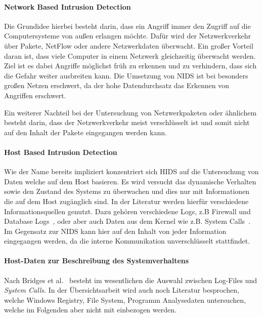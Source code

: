             \paragraph{Network Based Intrusion Detection}
                Die Grundidee hierbei besteht darin, dass ein Angriff immer den Zugriff auf die Computersysteme von außen erlangen möchte.
                Dafür wird der Netzwerkverkehr über Pakete, NetFlow oder andere Netzwerkdaten überwacht.
                Ein großer Vorteil daran ist, dass viele Computer in einem Netzwerk gleichzeitig überwacht werden.
                Ziel ist es dabei Angriffe möglichst früh zu erkennen und zu verhindern, dass sich die Gefahr weiter ausbreiten kann.
                Die Umsetzung von \ac{NIDS} ist bei besonders großen Netzen erschwert, da der hohe Datendurchsatz das Erkennen von Angriffen erschwert.~\cite{NIDS}

                Ein weiterer Nachteil bei der Untersuchung von Netzwerkpaketen oder ähnlichem besteht darin, dass der Netzwerkverkehr meist verschlüsselt ist und somit nicht auf den Inhalt der Pakete eingegangen werden kann.

            \paragraph{Host Based Intrusion Detection}
                Wie der Name bereits impliziert konzentriert sich \ac{HIDS} auf die Untersuchung von Daten welche auf dem Host basieren.
                Es wird versucht das dynamische Verhalten sowie den Zustand des Systems zu überwachen und dies nur mit Informationen die auf dem Host zugänglich sind.
                In der Literatur werden hierfür verschiedene Informationsquellen genutzt.
                Dazu gehören verschiedene Logs, z.B Firewall und Database Logs~\cite{IDSsurvey},
                oder aber auch Daten aus dem Kernel wie z.B. System Calls~\cite{MAGGI}.
                Im Gegensatz zur \ac{NIDS} kann hier auf den Inhalt von jeder Information eingegangen werden, da die interne Kommunikation unverschlüsselt stattfindet.~\cite{IDSBOOKHAY}

            \paragraph{Host-Daten zur Beschreibung des Systemverhaltens}
                 
                Nach Bridges et al.~\cite{HIDSSURVEY2019bridges} besteht im wesentlichen die Auswahl zwischen Log-Files und \textit{System Calls}.
                In der Übersichtsarbeit wird auch noch Literatur besprochen, welche Windows Registry, File System, Programm Analysedaten untersuchen, welche im Folgenden aber nicht mit einbezogen werden.

